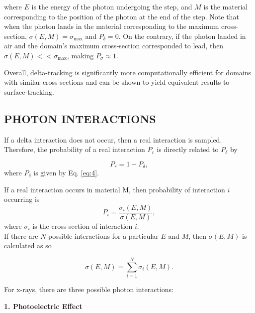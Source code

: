 \documentclass[%
 aip,
cp,  %
 amsmath,amssymb,%
reprint,%
]{revtex4-2}
\begin{document}
where $E$ is the energy of the photon undergoing the step, and $M$ is the material corresponding to the position of the photon at the end of the step. Note that when the photon lands in the material corresponding to the maximum cross-section, $\sigma(E, M) = \sigma_{\text{max}}$ and $P_{\delta} = 0$. On the contrary, if the photon landed in air and the domain's maximum cross-section corresponded to lead, then $\sigma(E, M) << \sigma_{\text{max}}$, making $P_{\sigma} \approx 1$.

\par Overall, delta-tracking is significantly more computationally efficient for domains with similar cross-sections and can be shown to yield equivalent results to surface-tracking.

\subsection{PHOTON INTERACTIONS}
If a delta interaction does not occur, then a real interaction is sampled. Therefore, the probability of a real interaction $P_r$ is directly related to $P_\delta$ by

\begin{equation}
    P_r = 1 - P_\delta,
\end{equation}
where $P_\delta$ is given by Eq. \ref{eq:4}.
\\
\par If a real interaction occurs in material M, then probability of interaction $i$ occurring is
\begin{equation}
    P_i = \frac{\sigma_i(E, M)}{\sigma (E, M)},
\end{equation}
where $\sigma_i$ is the cross-section of interaction $i$.\\

If there are $N$ possible interactions for a particular $E$ and $M$, then $\sigma (E, M)$ is calculated as so

\begin{equation}
    \sigma (E, M) = \sum_{i=1}^{N} \sigma_i(E, M).
\end{equation}


\par For x-rays, there are three possible photon interactions: \\

\begin{large}
    \bf{1. Photoelectric Effect}
\end{large}
\end{document}
